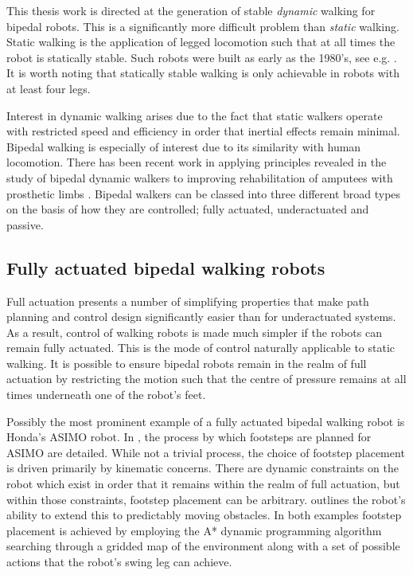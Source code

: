 This thesis work is directed at the generation of stable \textit{dynamic} walking for bipedal robots. This is a significantly more difficult problem than \textit{static} walking. Static walking is the application of legged locomotion such that at all times the robot is statically stable. Such robots were built as early as the 1980's, see e.g. \cite{russell1983odex, waldron1986adaptive}. It is worth noting that statically stable walking is only achievable in robots with at least four legs.

Interest in dynamic walking arises due to the fact that static walkers operate with restricted speed and efficiency in order that inertial effects remain minimal. Bipedal walking is especially of interest due to its similarity with human locomotion. There has been recent work in applying principles revealed in the study of bipedal dynamic walkers to improving rehabilitation of amputees with prosthetic limbs \cite{martinpredicting}. Bipedal walkers can be classed into three different broad types on the basis of how they are controlled; fully actuated, underactuated and passive.

\subsection{Fully actuated bipedal walking robots}
Full actuation presents a number of simplifying properties that make path planning and control design significantly easier than for underactuated systems. As a result, control of walking robots is made much simpler if the robots can remain fully actuated. This is the mode of control naturally applicable to static walking. It is possible to ensure bipedal robots remain in the realm of full actuation by restricting the motion such that the centre of pressure remains at all times underneath one of the robot's feet.

Possibly the most prominent example of a fully actuated bipedal walking robot is Honda's ASIMO robot. In \cite{chestnutt2005footstep}, the process by which footsteps are planned for ASIMO are detailed. While not a trivial process, the choice of footstep placement is driven primarily by kinematic concerns. There are dynamic constraints on the robot which exist in order that it remains within the realm of full actuation, but within those constraints, footstep placement can be arbitrary. \cite{chestnutt2007locomotion} outlines the robot's ability to extend this to predictably moving obstacles. In both examples footstep placement is achieved by employing the A* dynamic programming algorithm searching through a gridded map of the environment along with a set of possible actions that the robot's swing leg can achieve.

